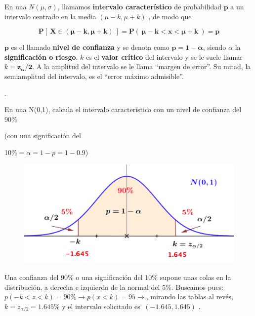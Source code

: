 \vspace{4mm} %
\begin{definition}
	
En una $N(\mu,\sigma)$,  llamamos \textbf{intervalo característico} de probabilidad  $\boldsymbol{p}$   a un intervalo centrado en la media  $(\mu -k,\mu +k)$ ,   de modo que 

$$\boldsymbol{ P \left[ \ X\in (\mu -k,\mu +k) \ \right] = P(\ \mu-k<x<\mu+k \ )=p }$$

$\boldsymbol{ p}$ es el llamado \textbf{nivel de confianza} y se denota como $\boldsymbol{ p=1-\alpha}$, siendo $\alpha$ la \textbf{significación o riesgo}. $k$ es el \textbf{valor crítico} del intervalo y se le suele llamar $k=\boldsymbol{z_{\alpha}/2}$. A la amplitud del intervalo se le llama ``margen de error''. Su mitad, la semiamplitud del intervalo, es el ``error máximo admisible''.
\end{definition}

\vspace{4mm} %
\begin{example}
.	
\begin{multicols}{2}
En una N(0,1), calcula el intervalo característico con un nivel de confianza del 90\% 

\vspace{4mm} (con una significación del 

10\%$=\alpha=1-p=1-0.9$)	

	\begin{figure}[H]
	\centering
	\includegraphics[width=.5\textwidth]{imagenes/imagenes05/T05IM02.png}
	\end{figure}
\end{multicols}

Una confianza del 90\% o una significación del 10\% supone unas colas en la distribución, a derecha e izquierda de la normal del 5\%. Buscamos pues: $p(-k<z<k)=90\% \longrightarrow  p(x<k)=95 	\to $, mirando las tablas al revés, $k=z_{\alpha/2}=1.645\%$ y el intervalo solicitado es $\ (-1.645,1.645)$ .

\end{example}

